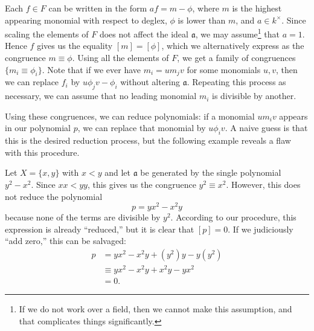 Each $f \in F$ can be written in the form $a f = m - \phi$, where $m$ is the highest appearing monomial with respect to deglex, $\phi$ is lower than $m$, and $a \in k^\times$. Since scaling the elements of $F$ does not affect the ideal $\mathfrak{a}$, we may assume\footnote{If we do not work over a field, then we cannot make this assumption, and that complicates things significantly.} that $a = 1$. Hence $f$ gives us the equality $[m] = [\phi]$, which we alternatively express as the congruence $m \equiv \phi$. Using all the elements of $F$, we get a family of congruences $\{ m_i \equiv \phi_i \}$. Note that if we ever have $m_i = um_jv$ for some monomials $u,v$, then we can replace $f_i$ by $u\phi_j v - \phi_i$ without altering $\mathfrak{a}$. Repeating this process as necessary, we can assume that no leading monomial $m_i$ is divisible by another.

Using these congruences, we can reduce polynomials: if a monomial $u m_i v$ appears in our polynomial $p$, we can replace that monomial by $u \phi_i v$. A naive guess is that this is the desired reduction process, but the following example reveals a flaw with this procedure.

\begin{example}\label{exa:x2-y2}
	Let $X=\{x,y\}$ with $x < y$ and let $\mathfrak{a}$ be generated by the single polynomial $y^2 - x^2$. Since $xx < yy$, this gives us the congruence $y^2 \equiv x^2$. However, this does not reduce the polynomial
	\[
		p = yx^2 - x^2 y
	\]
	because none of the terms are divisible by $y^2$. According to our procedure, this expression is already ``reduced,'' but it is clear that $[p]=0$. If we judiciously ``add zero,'' this can be salvaged:
	\begin{align*}
		p &= yx^2 - x^2 y + (y^2)y - y(y^2)\\
		&\equiv yx^2 - x^2 y + x^2 y - y x^2\\
		&= 0.
	\end{align*}
\end{example}

